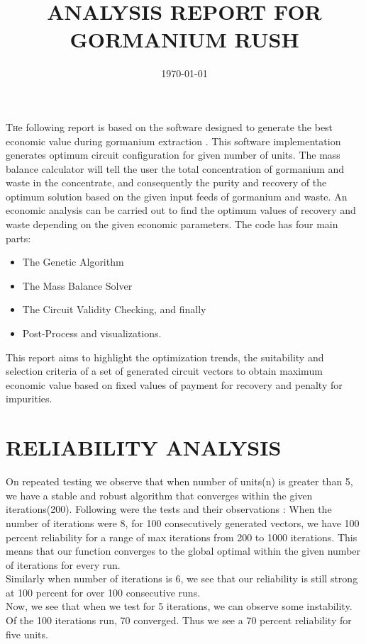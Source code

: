 \documentclass[twoside,twocolumn]{article}
\title{ANALYSIS REPORT FOR GORMANIUM RUSH} %
\date{\today} %
\begin{document}
\maketitle

\lettrine[nindent=1em,lines=2]{T}he following report is based on the software designed to generate the best economic value during gormanium extraction . This software implementation generates optimum circuit configuration for given number of units. The mass balance calculator will tell the user the total concentration of gormanium and waste in the concentrate, and consequently the purity and recovery of the optimum solution based on the given input feeds of gormanium and waste. An economic analysis can be carried out to find the optimum values of recovery and waste depending on the given economic parameters. The code has four main parts:
\begin{itemize}
\item The Genetic Algorithm
\item The Mass Balance Solver
\item The Circuit Validity Checking, and finally
\item Post-Process and visualizations.
\end{itemize}

This report aims to highlight the optimization trends, the suitability and selection criteria of a set of generated circuit vectors to obtain maximum economic value based on fixed values of payment for recovery and penalty for impurities.



\section{RELIABILITY ANALYSIS}
On repeated testing we observe that when number of units(n) is greater than 5, we have a stable and robust algorithm that converges within the given iterations(200).
Following were the tests and their observations :
When the number of iterations were 8, for 100 consecutively generated vectors, we have 100 percent reliability for a range of max iterations from 200 to 1000 iterations. This means that our function converges to the global optimal within the given number of iterations for every run. \\
Similarly when number of iterations is 6, we see that our reliability is still strong at 100 percent for over 100 consecutive runs. \\
Now, we see that when we test for 5 iterations, we can observe some instability. Of the 100 iterations run, 70 converged. Thus we see a 70 percent reliability for five units.
\end{document}
